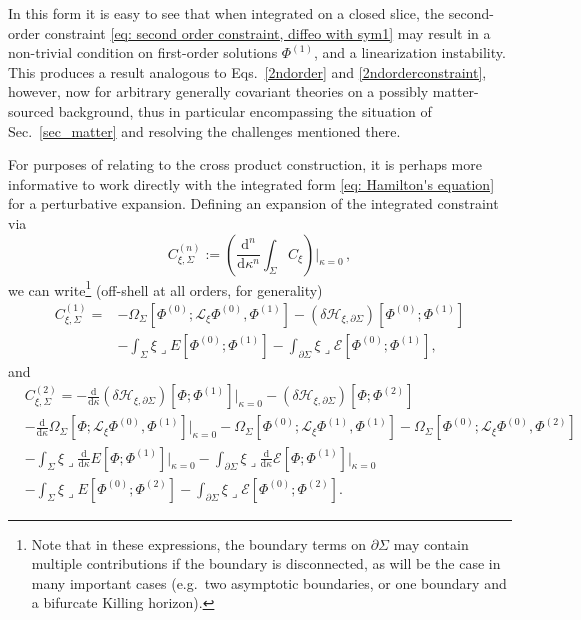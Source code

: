 \documentclass[]{jkpaper}
\theoremstyle{plain}
\theoremstyle{definition}
\newcommand{\sins}{\mathop{\lrcorner}}
\newcommand{\sd}{\mathrm {d}}
\newcommand{\sL}{\mathcal{L}}
\begin{document}
In this form it is easy to see that when integrated on a closed slice, the second-order constraint \eqref{eq: second order constraint, diffeo with sym1} may result in a non-trivial condition on first-order solutions $\Phi^{(1)}$, and a linearization instability. This produces a result analogous to Eqs.~\eqref{2ndorder} and \eqref{2ndorderconstraint}, however, now for arbitrary generally covariant theories on a possibly matter-sourced background, thus in particular encompassing the situation of Sec.~\ref{sec_matter} and resolving the challenges mentioned there.

For purposes of relating to the cross product construction, it is perhaps more informative to work directly with the integrated form \eqref{eq: Hamilton's equation} for a perturbative expansion.  Defining an expansion of the integrated constraint via
\begin{equation}\label{eq: perturbative integrated constraints}
C^{(n)}_{\xi,\Sigma}:=\left(\frac{\sd^n}{\sd\kappa^n}\int_\Sigma C_\xi\right)\big|_{\kappa=0}\,,
\end{equation}
we can write\footnote{Note that in these expressions, the boundary terms on $\partial\Sigma$ may contain multiple contributions if the boundary is disconnected, as will be the case in many important cases (e.g.\ two asymptotic boundaries, or one boundary and a bifurcate Killing horizon).} (off-shell at all orders, for generality)
\begin{equation}\begin{split}\label{eq: first order integrated}
    C_{\xi,\Sigma}^{(1)}
    =&-\Omega_{\Sigma}\left[\Phi^{(0)};\sL_\xi\Phi^{(0)},\Phi^{(1)}\right]-(\delta\mathcal{H}_{\xi,\partial\Sigma})\left[\Phi^{(0)};\Phi^{(1)}\right]\\
    &-\int_\Sigma \xi\sins E\left[\Phi^{(0)};\Phi^{(1)}\right]
    -\int_{\partial\Sigma}\xi\sins\mathcal{E}\left[\Phi^{(0)};\Phi^{(1)}\right],
\end{split}\end{equation}
and
\begin{equation}\begin{split}\label{eq: first C2 expression}
    &C^{(2)}_{\xi,\Sigma}
    =-\frac{\sd}{\sd\kappa}(\delta\mathcal{H}_{\xi,\partial\Sigma})\left[\Phi;\Phi^{(1)}\right]\big|_{\kappa=0}-(\delta\mathcal{H}_{\xi,\partial\Sigma})\left[\Phi;\Phi^{(2)}\right]\\
    &-\frac{\sd}{\sd\kappa}\Omega_{\Sigma}\left[\Phi;\sL_\xi\Phi^{(0)},\Phi^{(1)}\right]
    \big|_{\kappa=0}
    -\Omega_{\Sigma}\left[\Phi^{(0)};\sL_\xi\Phi^{(1)},\Phi^{(1)}\right]
    -\Omega_{\Sigma}\left[\Phi^{(0)};\sL_\xi\Phi^{(0)},\Phi^{(2)}\right]\\
    &-\int_\Sigma \xi\sins \frac{\sd}{\sd\kappa}E\left[\Phi;\Phi^{(1)}\right]\big|_{\kappa=0}
    -\int_{\partial\Sigma} \xi\sins\frac{\sd}{\sd\kappa}\mathcal{E} \left[\Phi;\Phi^{(1)}\right]\big|_{\kappa=0}\\
    &-\int_\Sigma \xi\sins E\left[\Phi^{(0)};\Phi^{(2)}\right]
    -\int_{\partial\Sigma} \xi\sins\mathcal{E} \left[\Phi^{(0)};\Phi^{(2)}\right].
\end{split}\end{equation}
\end{document}
